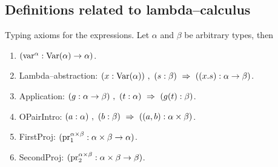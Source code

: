 \subsection{Definitions related to lambda--calculus}
\begin{axiom}
Typing axioms for the expressions.
Let $\alpha$ and $\beta$ be arbitrary types, then
\begin{enumerate}
\item $({\textrm{var}}^\alpha : \mathrm{Var}(\alpha) \to \alpha)$.

\item Lambda--abstraction: $(x:\Var(\alpha))\ ,\ (s:\beta) \Implies ((x.s):\alpha\to \beta)$.
\item Application: $(g:\alpha\to \beta)\ ,\ (t:\alpha) \Implies (g(t):\beta)$.
\item OPairIntro:
$(a:\alpha)\ ,\ (b:\beta) \ \Rightarrow\  ((a,b):\alpha\times\beta)$.
\item FirstProj: $(\mathrm{pr}^{\alpha\times\beta}_1:\alpha\times\beta\to\alpha)$.
\item SecondProj: $(\mathrm{pr}^{\alpha\times\beta}_2:\alpha\times\beta\to\beta)$.

\end{enumerate}
\end{axiom}

